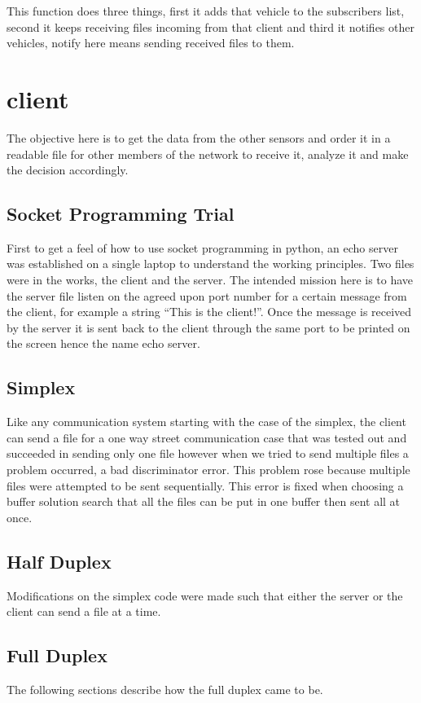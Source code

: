 This function does three things, first it adds that vehicle to the subscribers list, second it keeps receiving files incoming from that client and third it notifies other vehicles, notify here means sending received files to them. 

\section{client}
The objective here is to get the data from the other sensors and order it in a readable file for other members of the network to receive it, analyze it and make the decision accordingly.

\subsection{Socket Programming Trial}
First to get a feel of how to use socket programming in python, an echo server was established on a single laptop to understand the working principles. Two files were in the works, the client and the server. The intended mission here is to have the server file listen on the agreed upon port number for a certain message from the client, for example a string “This is the client!”. Once the message is received by the server it is sent back to the client through the same port to be printed on the screen hence the name echo server.

\subsection{Simplex}
Like any communication system starting with the case of the simplex, the client can send a file for a one way street communication case that was tested out and succeeded in sending only one file however when we tried to send multiple files a problem occurred, a bad discriminator error. This problem rose because multiple files were attempted to be sent sequentially. This error is fixed when choosing a buffer solution search that all the files can be put in one buffer then sent all at once.

\subsection{Half Duplex}
Modifications on the simplex code were made such that either the server or the client can send a file at a time.

\subsection{Full Duplex}
The following sections describe how the full duplex came to be.

